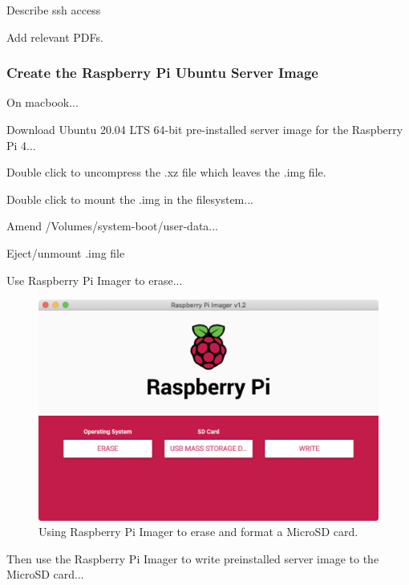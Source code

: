 \documentclass{article}
\begin{document}
Describe ssh access

Add relevant PDFs.


\subsubsection{Create the Raspberry Pi Ubuntu Server Image}

On macbook...

Download Ubuntu 20.04 LTS 64-bit pre-installed server image for the Raspberry Pi 4...

Double click to uncompress the .xz file which leaves the .img file. 

Double click to mount the .img in the filesystem...

Amend /Volumes/system-boot/user-data...



Eject/unmount .img file

Use Raspberry Pi Imager to erase...

\begin{figure}
	\centering	
	\includegraphics[width=1.0\textwidth]{screenshots/imager-erase.png}
	\caption{Using Raspberry Pi Imager to erase and format a MicroSD card.}
\end{figure}

Then use the Raspberry Pi Imager to write preinstalled server image to the MicroSD card...
\end{document}
